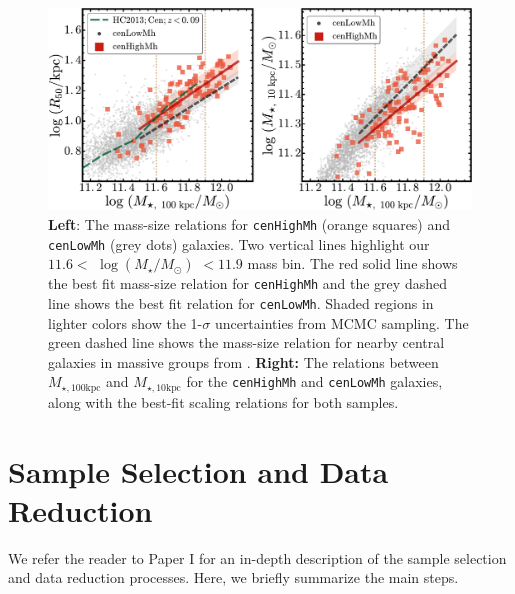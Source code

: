 \documentclass[a4paper,fleqn,usenatbib]{mnras}
\def\rbcg{\texttt{cenHighMh}}
\def\nbcg{\texttt{cenLowMh}}
\def\logms{{$\log (M_{\star}/M_{\odot})$}}
\def\minn{{$M_{\star,10\mathrm{kpc}}$}}
\def\mtot{{$M_{\star,100\mathrm{kpc}}$}}
\begin{document}
  \begin{figure}
      \centering 
      \includegraphics[width=\textwidth]{fig/redbcg_scaling_relation}
      \caption{
          \textbf{Left}: The mass-size relations for \rbcg{} (orange squares) and 
          \nbcg{} (grey dots) galaxies. 
          Two vertical lines highlight our $11.6<$ \logms{} $<11.9$ mass bin. 
          The red solid line shows the best fit mass-size relation for \rbcg{} and the 
          grey dashed line shows the best fit relation for \nbcg{}. 
          Shaded regions in lighter colors show the 1-$\sigma$ uncertainties
          from MCMC sampling.  
          The green dashed line shows the mass-size relation for nearby central 
          galaxies in massive groups from \citet{HCompany13}. 
          \textbf{Right:} The relations between \mtot{} and \minn{} for the 
          \rbcg{} and \nbcg{} galaxies, along with the best-fit scaling relations for 
          both samples.
          }
      \label{fig:scaling_relation} 
  \end{figure}

\section{Sample Selection and Data Reduction}
    \label{sec:data}
    
    We refer the reader to Paper I for an in-depth description of the sample selection 
    and data reduction processes. 
    Here, we briefly summarize the main steps.
    
\end{document}
